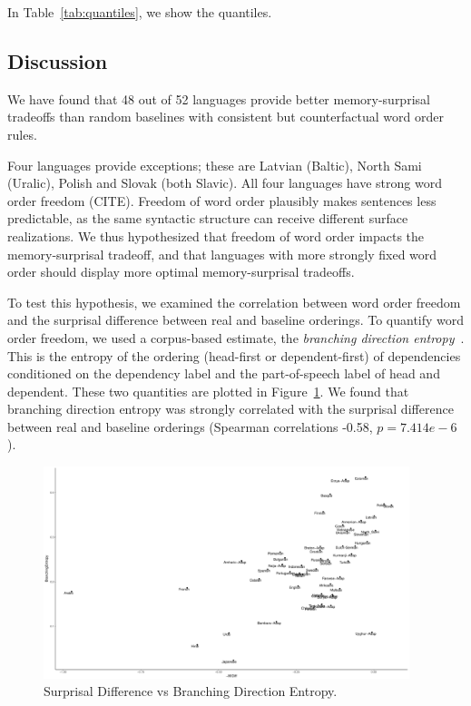 \documentclass[11pt,letterpaper]{article}
\begin{document}
In Table~\ref{tab:quantiles}, we show the quantiles.





\subsection{Discussion}

We have found that 48 out of 52 languages provide better memory-surprisal tradeoffs than random baselines with consistent but counterfactual word order rules.

Four languages provide exceptions; these are Latvian (Baltic), North Sami (Uralic), Polish and Slovak (both Slavic).
All four languages have strong word order freedom (CITE).
Freedom of word order plausibly makes sentences less predictable, as the same syntactic structure can receive different surface realizations.
We thus hypothesized that freedom of word order impacts the memory-surprisal tradeoff, and that languages with more strongly fixed word order should display more optimal memory-surprisal tradeoffs.

To test this hypothesis, we examined the correlation between word order freedom and the surprisal difference between real and baseline orderings.
To quantify word order freedom, we used a corpus-based estimate, the \emph{branching direction entropy}~\citep{futrell-quantifying-2015}.
This is the entropy of the ordering (head-first or dependent-first) of dependencies conditioned on the dependency label and the part-of-speech label of head and dependent.
These two quantities are plotted in Figure~\ref{fig:hist-real}.
We found that branching direction entropy was strongly correlated with the surprisal difference between real and baseline orderings (Spearman correlations -0.58, $p = 7.414e-6$).



\begin{figure}
\includegraphics[width=0.95\textwidth]{neural/figures/surprisal-branching-entropy-REAL.pdf}
	\caption{Surprisal Difference vs Branching Direction Entropy.}\label{fig:hist-real}
\end{figure}
\end{document}
